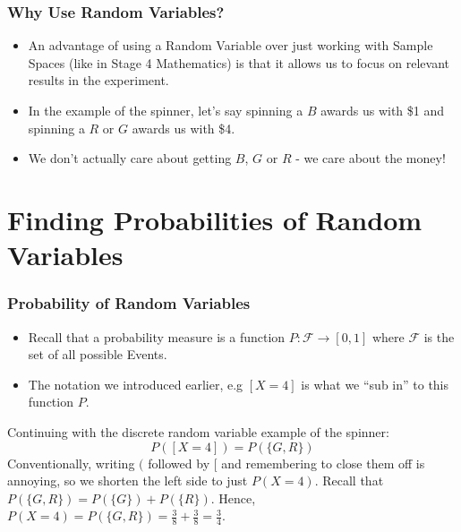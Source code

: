 \documentclass{beamer}
\begin{document}
\begin{frame}
  \frametitle{Why Use Random Variables?}
  \begin{itemize}
    \item<2-> An advantage of using a Random Variable over just working with Sample Spaces (like in Stage 4 Mathematics) is that it allows us to focus on relevant results in the experiment.
    \item<3-> In the example of the spinner, let's say spinning a $B$ awards us with \$1 and spinning a $R$ or $G$ awards us with \$4.
    \item<4-> We don't actually care about getting $B$, $G$ or $R$ - we care about the money!
  \end{itemize}
\end{frame}


\section{Finding Probabilities of Random Variables}


\begin{frame}
  \frametitle{Probability of Random Variables}
  \begin{itemize}
    \item<1-> Recall that a probability measure is a function $P: \mathscr{F} \rightarrow [0,1]$ where $\mathscr{F}$ is the set of all possible Events.
    \item<2-> The notation we introduced earlier, e.g $[X = 4]$ is what we ``sub in'' to this function $P$.
  \end{itemize}
  \pause\pause
  \begin{example}
    Continuing with the discrete random variable example of the spinner:
    \[ P([X = 4]) = P(\{G, R\}) \]
    \pause
    Conventionally, writing $($ followed by $[$ and remembering to close them off is annoying, so we shorten the left side to just $P(X=4)$.
    \pause
    Recall that $P(\{G, R\}) = P(\{G\}) + P(\{R\})$.
    \pause
    Hence, $P(X=4) = P(\{G, R\}) = \frac{3}{8} + \frac{3}{8} = \frac{3}{4}$.
  \end{example}
\end{frame}
\end{document}

